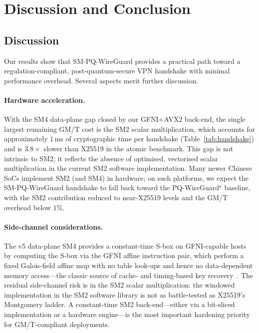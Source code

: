\documentclass{SCIS2026}
\begin{document}
\section{Discussion and Conclusion}
\label{sec:disc}

\subsection{Discussion}

Our results show that SM-PQ-WireGuard provides a practical path toward
a regulation-compliant, post-quantum-secure VPN handshake with minimal
performance overhead.  Several aspects merit further discussion.

\paragraph{Hardware acceleration.}
With the SM4 data-plane gap closed by our GFNI+AVX2 back-end, the
single largest remaining GM/T cost is the SM2 scalar multiplication,
which accounts for approximately $1$\,ms of cryptographic time per
handshake (Table~\ref{tab:handshake}) and is $3.8\times$ slower than
X25519 in the atomic benchmark.  This gap is not intrinsic to SM2; it
reflects the absence of optimised, vectorised scalar multiplication in
the current SM2 software implementation.  Many newer Chinese SoCs implement
SM2 (and SM4) in hardware; on such platforms, we expect the
SM-PQ-WireGuard handshake to fall back toward the
PQ-WireGuard$^\star$ baseline, with the SM2 contribution reduced to
near-X25519 levels and the GM/T overhead below $1\%$.

\paragraph{Side-channel considerations.}
The v5 data-plane SM4 provides a constant-time S-box on GFNI-capable
hosts by computing the S-box via the GFNI affine instruction pair,
which perform a fixed Galois-field affine map with no table look-ups
and hence no data-dependent memory access---the classic source of
cache- and timing-based key recovery~\cite{44,45}.  The residual side-channel
risk is in the SM2 scalar multiplication: the windowed implementation
in the SM2 software library is not as battle-tested as X25519's
Montgomery ladder.  A constant-time SM2 back-end---either via a
bit-sliced implementation or a hardware engine---is the most important
hardening priority for GM/T-compliant deployments.
\end{document}
